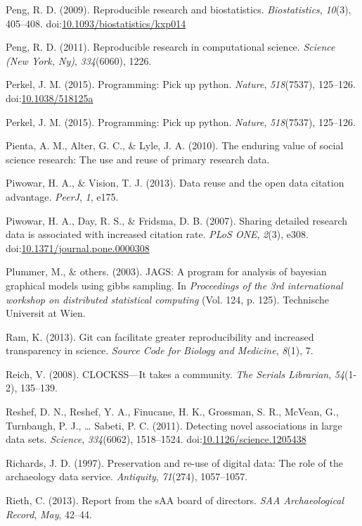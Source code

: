 \documentclass[american,man]{apa6}
\begin{document}
Peng, R. D. (2009). Reproducible research and biostatistics.
\emph{Biostatistics}, \emph{10}(3), 405--408.
doi:\href{http://dx.doi.org/10.1093/biostatistics/kxp014}{10.1093/biostatistics/kxp014}

Peng, R. D. (2011). Reproducible research in computational science.
\emph{Science (New York, Ny)}, \emph{334}(6060), 1226.

Perkel, J. M. (2015). Programming: Pick up python. \emph{Nature},
\emph{518}(7537), 125--126.
doi:\href{http://dx.doi.org/10.1038/518125a}{10.1038/518125a}

Perkel, J. M. (2015). Programming: Pick up python. \emph{Nature},
\emph{518}(7537), 125--126.

Pienta, A. M., Alter, G. C., \& Lyle, J. A. (2010). The enduring value
of social science research: The use and reuse of primary research data.

Piwowar, H. A., \& Vision, T. J. (2013). Data reuse and the open data
citation advantage. \emph{PeerJ}, \emph{1}, e175.

Piwowar, H. A., Day, R. S., \& Fridsma, D. B. (2007). Sharing detailed
research data is associated with increased citation rate. \emph{PLoS
ONE}, \emph{2}(3), e308.
doi:\href{http://dx.doi.org/10.1371/journal.pone.0000308}{10.1371/journal.pone.0000308}

Plummer, M., \& others. (2003). JAGS: A program for analysis of bayesian
graphical models using gibbs sampling. In \emph{Proceedings of the 3rd
international workshop on distributed statistical computing} (Vol. 124,
p. 125). Technische Universit at Wien.

Ram, K. (2013). Git can facilitate greater reproducibility and increased
transparency in science. \emph{Source Code for Biology and Medicine},
\emph{8}(1), 7.

Reich, V. (2008). CLOCKSS---It takes a community. \emph{The Serials
Librarian}, \emph{54}(1-2), 135--139.

Reshef, D. N., Reshef, Y. A., Finucane, H. K., Grossman, S. R., McVean,
G., Turnbaugh, P. J., \ldots{} Sabeti, P. C. (2011). Detecting novel
associations in large data sets. \emph{Science}, \emph{334}(6062),
1518--1524.
doi:\href{http://dx.doi.org/10.1126/science.1205438}{10.1126/science.1205438}

Richards, J. D. (1997). Preservation and re-use of digital data: The
role of the archaeology data service. \emph{Antiquity}, \emph{71}(274),
1057--1057.

Rieth, C. (2013). Report from the sAA board of directors. \emph{SAA
Archaeological Record}, \emph{May}, 42--44.
\end{document}

